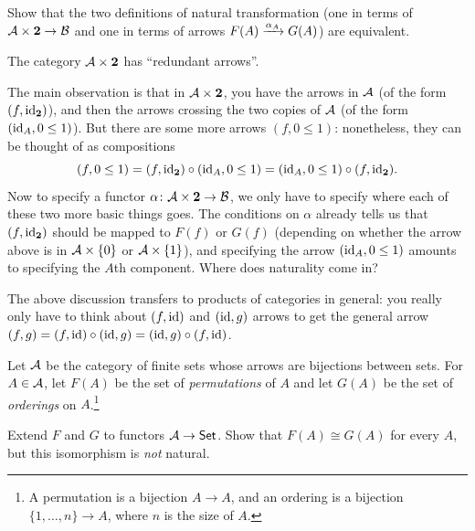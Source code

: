 \begin{problem}
	Show that the two definitions of natural transformation
	(one in terms of $\AA \times \mathbf 2 \to \BB$
	and one in terms of arrows $F(A) \taking{\alpha_A} G(A)$)
	are equivalent.
	\begin{hint}
		The category $\AA \times \mathbf 2$ has ``redundant arrows''.
	\end{hint}
	\begin{sol}
		The main observation is that in $\AA \times \mathbf 2$,
		you have the arrows in $\AA$ (of the form $(f, \id_{\mathbf 2})$),
		and then the arrows crossing the two copies of $\AA$ (of the form $(\id_A, 0 \le 1)$).
		But there are some more arrows $(f, 0 \le 1)$: nonetheless, they can be thought of as compositions
		\[ (f, 0 \le 1) = (f, \id_{\mathbf 2}) \circ (\id_A, 0 \le 1) = (\id_A, 0 \le 1) \circ (f, \id_{\mathbf 2}). \]
		Now to specify a functor $\alpha \colon \AA \times \mathbf 2 \to \BB$,
		we only have to specify where each of these two more basic things goes.
		The conditions on $\alpha$ already tells us that $(f, \id_{\mathbf 2})$
		should be mapped to $F(f)$ or $G(f)$
		(depending on whether the arrow above is in $\AA \times \{0\}$ or $\AA \times \{1\}$),
		and specifying the arrow $(\id_A, 0 \le 1)$ amounts to specifying the $A$th component.
		Where does naturality come in?

		The above discussion transfers to products of categories in general:
		you really only have to think about $(f, \id)$ and $(\id, g)$ arrows
		to get the general arrow $(f,g) = (f, \id) \circ (\id, g) = (\id, g) \circ (f, \id)$.
	\end{sol}
\end{problem}

\begin{problem}
	Let $\AA$ be the category of finite sets whose arrows are bijections between sets.
	For $A \in \AA$,
		let $F(A)$ be the set of \emph{permutations} of $A$ and
		let $G(A)$ be the set of \emph{orderings} on $A$.\footnote{A permutation
			is a bijection $A \to A$, and an ordering is a bijection $\{1, \dots, n\} \to A$,
			where $n$ is the size of $A$.}
	\begin{enumerate}[(a)]
		\ii Extend $F$ and $G$ to functors $\AA \to \catname{Set}$.
		\ii Show that $F(A) \cong G(A)$ for every $A$, but this isomorphism is \emph{not} natural.
	\end{enumerate}
\end{problem}



